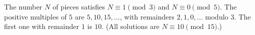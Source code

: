 The number $N$ of pieces satisfies $N\equiv1\pmod3$ and $N\equiv0\pmod5$. The positive multiples of $5$ are $5,10,15,\dots$, with remainders $2,1,0,\dots$ modulo $3$. The first one with remainder $1$ is $\boxed{10}$. (All solutions are $N\equiv10\pmod{15}$.)
